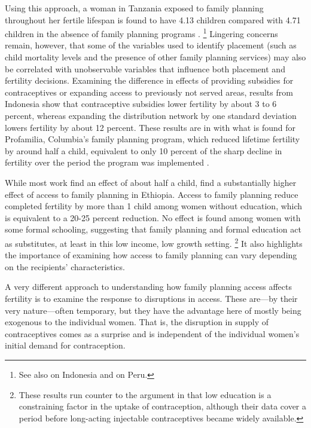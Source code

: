 \documentclass[letterpaper,12pt]{article}
\begin{document}
Using this approach, a woman in Tanzania exposed to family planning throughout 
her fertile lifespan is found to have 4.13 children compared with 4.71 children 
in the absence of family planning programs \citep{angeles98}.%
\footnote{
See also \citet{Angeles2005} on Indonesia and \citep{Angeles2005a} on Peru.
}
Lingering concerns remain, however, that some of the variables used to identify placement
(such as child mortality levels and the presence of other family planning services)
may also be correlated with unobservable variables that influence 
both placement and fertility decisions.
Examining the difference in effects of providing subsidies for contraceptives
or expanding access to previously not served areas, results from Indonesia
show that contraceptive subsidies lower fertility by about 3 to 6 percent,
whereas expanding the distribution network by one standard deviation 
lowers fertility by about 12 percent\citep{Molyneaux2000}.
These results are in with what is found for Profamilia, Columbia's family 
planning program, which reduced lifetime fertility by around 
half a child, equivalent to only 10 percent of the sharp decline in fertility 
over the period the program was implemented \citep{Miller2010}.

While most work find an effect of about half a child, \citet{Portner2011}
find a substantially higher effect of access to family planning in Ethiopia.
Access to family planning reduce completed fertility by more than 1 child among 
women without education, which is equivalent to a 20-25 percent reduction.
No effect is found among women with some formal schooling, suggesting that 
family planning and formal education act as 
substitutes, at least in this low income, low growth setting.%
\footnote{
These results run counter to the argument in \citet{Feyisetan1996}
that low education is a constraining factor in the uptake of contraception,
although their data cover a period before long-acting injectable
contraceptives became widely available.
}
It also highlights the importance of examining how access to family planning
can vary depending on the recipients' characteristics.


A very different approach to understanding how family planning access
affects fertility is to examine the response to disruptions in access.
These are---by their very nature---often temporary, but they have
the advantage here of mostly being exogenous to the individual women.
That is, the disruption in supply of contraceptives comes as a
surprise and is independent of the individual women's initial
demand for contraception.
\end{document}
